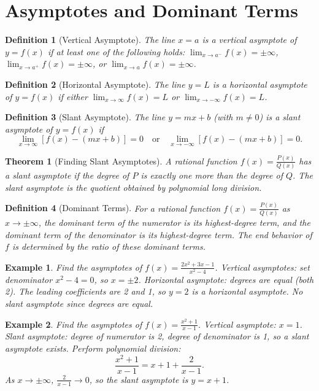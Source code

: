 \documentclass[11pt,a4paper]{article}
\newtheorem{example}{Example}
\newtheorem{theorem}{Theorem}
\newtheorem{definition}{Definition}
\begin{document}
\section{Asymptotes and Dominant Terms}
\begin{definition}[Vertical Asymptote]
The line $x = a$ is a \textit{vertical asymptote} of $y = f(x)$ if at least one of the following holds: $\lim_{x \to a^-} f(x) = \pm\infty$, $\lim_{x \to a^+} f(x) = \pm\infty$, or $\lim_{x \to a} f(x) = \pm\infty$.
\end{definition}
\begin{definition}[Horizontal Asymptote]
The line $y = L$ is a \textit{horizontal asymptote} of $y = f(x)$ if either $\lim_{x \to \infty} f(x) = L$ or $\lim_{x \to -\infty} f(x) = L$.
\end{definition}
\begin{definition}[Slant Asymptote]
The line $y = mx + b$ (with $m \neq 0$) is a \textit{slant asymptote} of $y = f(x)$ if
\[
\lim_{x \to \infty} [f(x) - (mx + b)] = 0 \quad \text{or} \quad \lim_{x \to -\infty} [f(x) - (mx + b)] = 0.
\]
\end{definition}
\begin{theorem}[Finding Slant Asymptotes]
A rational function $f(x) = \frac{P(x)}{Q(x)}$ has a slant asymptote if the degree of $P$ is exactly one more than the degree of $Q$. The slant asymptote is the quotient obtained by polynomial long division.
\end{theorem}
\begin{definition}[Dominant Terms]
For a rational function $f(x) = \frac{P(x)}{Q(x)}$ as $x \to \pm\infty$, the \textit{dominant term} of the numerator is its highest-degree term, and the dominant term of the denominator is its highest-degree term. The end behavior of $f$ is determined by the ratio of these dominant terms.
\end{definition}
\begin{example}
Find the asymptotes of $f(x) = \frac{2x^2 + 3x - 1}{x^2 - 4}$.
Vertical asymptotes: set denominator $x^2 - 4 = 0$, so $x = \pm 2$.
Horizontal asymptote: degrees are equal (both 2). The leading coefficients are 2 and 1, so $y = 2$ is a horizontal asymptote.
No slant asymptote since degrees are equal.
\end{example}
\begin{example}
Find the asymptotes of $f(x) = \frac{x^2 + 1}{x - 1}$.
Vertical asymptote: $x = 1$.
Slant asymptote: degree of numerator is 2, degree of denominator is 1, so a slant asymptote exists. Perform polynomial division:
\[
\frac{x^2 + 1}{x - 1} = x + 1 + \frac{2}{x - 1}.
\]
As $x \to \pm\infty$, $\frac{2}{x - 1} \to 0$, so the slant asymptote is $y = x + 1$.
\end{example}
\end{document}
